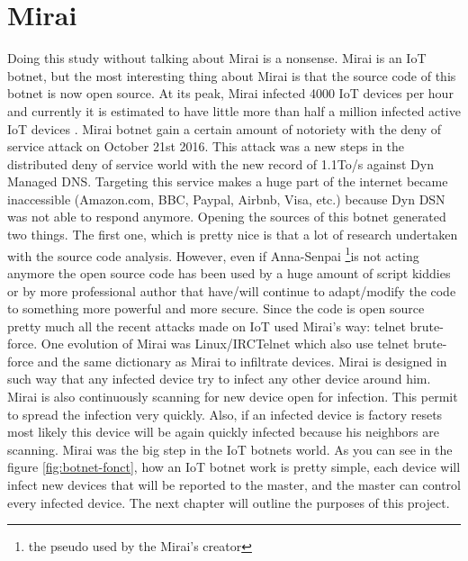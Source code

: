 \documentclass{report}
\begin{document}
\section{Mirai}
Doing this study without talking about Mirai is a nonsense. Mirai is an IoT botnet, but the most interesting thing about Mirai is that the source code of this botnet is now open source. At its peak, Mirai infected 4000 IoT devices per hour and currently it is estimated to have little more than half a million infected active IoT devices \autocite{angrishi2017turning}. Mirai botnet gain a certain amount of notoriety with the deny of service attack on October 21st 2016. This attack was a new steps in the distributed deny of service world with the new record of 1.1To/s against Dyn Managed DNS. Targeting this service makes a huge part of the internet became inaccessible (Amazon.com, BBC, Paypal, Airbnb, Visa, etc.) because Dyn DSN was not able to respond anymore.\newline
Opening the sources of this botnet generated two things. The first one, which is pretty nice is that a lot of research undertaken with the source code analysis. However, even if Anna-Senpai \footnote{the pseudo used by the Mirai's creator}is not acting anymore the open source code has been used by a huge amount of script kiddies or by more professional author that have/will continue to adapt/modify the code to something more powerful and more secure. Since the code is open source pretty much all the recent attacks made on IoT used Mirai's way: telnet brute-force.
One evolution of Mirai was Linux/IRCTelnet which also use telnet brute-force and the same dictionary as Mirai to infiltrate devices.\newline
\newline
Mirai is designed in such way that any infected device try to infect any other device around him. Mirai is also continuously scanning for new device open for infection. This permit to spread the infection very quickly. Also, if an infected device is factory resets most likely this device will be again quickly infected because his neighbors are scanning. Mirai was the big step in the IoT botnets world.\newline
\newline
As you can see in the figure \ref{fig:botnet-fonct}, how an IoT botnet work is pretty simple, each device will infect new devices that will be reported to the master, and the master can control every infected device.\newline
The next chapter will outline the purposes of this project.
\end{document}
